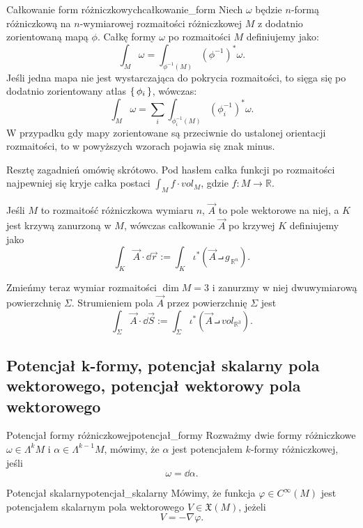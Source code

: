 \documentclass{article}
\newcommand\R{\mathbb{R}}
\begin{document}
\begin{dfn}{Całkowanie form różniczkowych}{całkowanie_form}
Niech $\omega$ będzie $n$-formą różniczkową na $n$-wymiarowej rozmaitości różniczkowej $M$ z dodatnio zorientowaną mapą $\phi$. Całkę formy $\omega$ po rozmaitości $M$ definiujemy jako:
\[
\int_M{\omega} = \int_{\phi^{-1}(M)}{\!(\phi^{-1})^*\omega}.
\]
Jeśli jedna mapa nie jest wystarczająca do pokrycia rozmaitości, to sięga się po dodatnio zorientowany atlas $\set{\phi_i}$, wówczas:
\[
\int_M{\omega} = \sum_{i} \int_{\phi^{-1}_i(M)}{\!(\phi^{-1}_i)^*\omega}.
\]
W przypadku gdy mapy zorientowane są przeciwnie do ustalonej orientacji rozmaitości, to w powyższych wzorach pojawia się znak minus. 
\end{dfn}

Resztę zagadnień omówię skrótowo. Pod hasłem całka funkcji po rozmaitości najpewniej się kryje całka postaci $\int_M{f\cdot vol_{M}}$, gdzie $f:M\to\R$.

Jeśli $M$ to rozmaitość różniczkowa wymiaru $n$, $\vec{A}$ to pole wektorowe na niej, a $K$ jest krzywą zanurzoną w $M$, wówczas całkowanie $\vec{A}$ po krzywej $K$ definiujemy jako $$\int_{K} \vec{A}\cdot\dd{\vec{r}}:=\int_{K}\iota^*(\vec{A}\intprod g_{\,\R^n}).$$ 

Zmieńmy teraz wymiar rozmaitości $\dim{M}=3$ i zanurzmy w niej dwuwymiarową powierzchnię $\Sigma$. Strumieniem pola $\vec{A}$ przez powierzchnię $\Sigma$ jest $$\int_{\Sigma}\vec{A}\cdot\dd{\vec{S}}:=\int_{\Sigma}\iota^*(\vec{A}\intprod vol_{\R^3}).$$

\subsection{Potencjał k-formy, potencjał skalarny pola wektorowego, potencjał wektorowy pola wektorowego}



\begin{dfn}{Potencjał formy różniczkowej}{potencjał_formy}
  Rozważmy dwie formy różniczkowe $\omega\in\Lambda^k M$ i $\alpha\in\Lambda^{k-1}M$, mówimy, że $\alpha$ jest potencjałem $k$-formy różniczkowej, jeśli
  \[
  \omega = \dd{\alpha}.
  \]
\end{dfn}

\begin{dfn}{Potencjał skalarny}{potencjał_skalarny}
  Mówimy, że funkcja $\varphi\in C^{\infty}(M)$ jest potencjałem skalarnym pola wektorowego $V\in\mathfrak{X}(M)$, jeżeli
  \[
  V = -\nabla \varphi.
  \]
\end{dfn}
\end{document}
